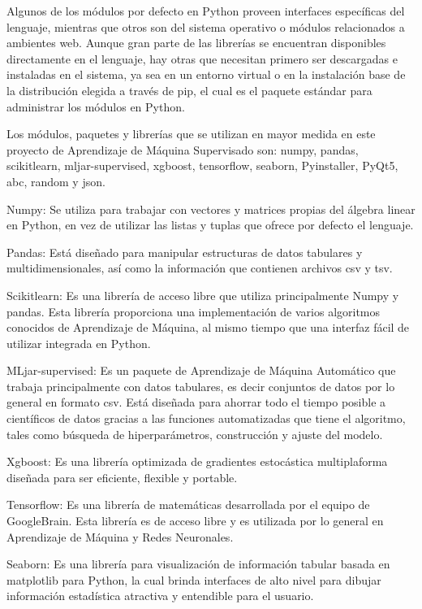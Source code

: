 Algunos de los módulos por defecto en Python proveen interfaces específicas del lenguaje, mientras que otros son del sistema operativo o módulos relacionados a ambientes web. Aunque gran parte de las librerías se encuentran disponibles directamente en el lenguaje, hay otras que necesitan primero ser descargadas e instaladas en el sistema, ya sea en un entorno virtual o en la instalación base de la distribución elegida a través de pip, el cual es el paquete estándar para administrar los módulos en Python. 

Los módulos, paquetes y librerías que se utilizan en mayor medida en este proyecto de Aprendizaje de Máquina Supervisado son: numpy, pandas, scikitlearn, mljar-supervised, xgboost, tensorflow, seaborn, Pyinstaller, PyQt5, abc, random y json. 

\begin{APAitemize}
    \item Numpy: Se utiliza para trabajar con vectores y matrices propias del álgebra linear en Python, en vez de utilizar las listas y tuplas que ofrece por defecto el lenguaje.
    \item Pandas: Está diseñado para manipular estructuras de datos tabulares y multidimensionales, así como la información que contienen archivos csv y tsv.
    \item Scikitlearn: Es una librería de acceso libre que utiliza principalmente Numpy y pandas. Esta librería proporciona una implementación de varios algoritmos conocidos de Aprendizaje de Máquina, al mismo tiempo que una interfaz fácil de utilizar integrada en Python.
    \item MLjar-supervised: Es un paquete de Aprendizaje de Máquina Automático que trabaja principalmente con datos tabulares, es decir conjuntos de datos por lo general en formato csv. Está diseñada para ahorrar todo el tiempo posible a científicos de datos gracias a las funciones automatizadas que tiene el algoritmo, tales como búsqueda de hiperparámetros, construcción y ajuste del modelo.
    \item Xgboost: Es una librería optimizada de gradientes estocástica multiplaforma diseñada para ser eficiente, flexible y portable.
    \item Tensorflow: Es una librería de matemáticas desarrollada por el equipo de GoogleBrain. Esta librería es de acceso libre y es utilizada por lo general en Aprendizaje de Máquina y Redes Neuronales.
    \item Seaborn: Es una librería para visualización de información tabular basada en matplotlib para Python, la cual brinda interfaces de alto nivel para dibujar información estadística atractiva y entendible para el usuario.

\end{APAitemize}
